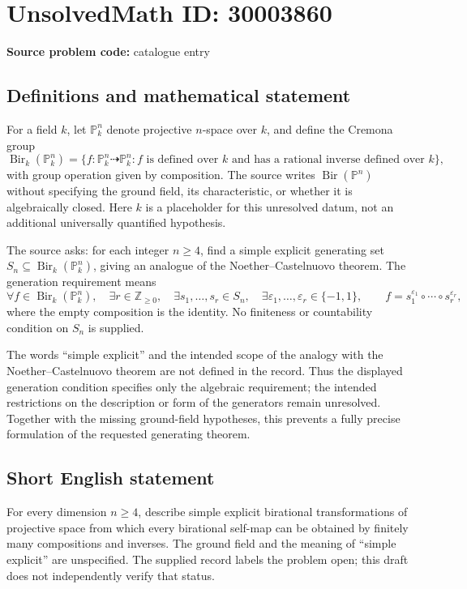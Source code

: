 \documentclass[11pt]{article}
\newcommand{\Z}{\mathbb{Z}}
\newcommand{\PP}{\mathbb{P}}
\begin{document}
\section*{UnsolvedMath ID: 30003860}
\textbf{Source problem code:} catalogue entry
\subsection{Definitions and mathematical statement}
For a field \(k\), let \(\PP^n_k\) denote projective \(n\)-space over \(k\), and define the Cremona group
\[
\operatorname{Bir}_k(\PP^n_k)=\{f\colon\PP^n_k\dashrightarrow\PP^n_k : f\text{ is defined over }k\text{ and has a rational inverse defined over }k\},
\]
with group operation given by composition. The source writes \(\operatorname{Bir}(\PP^n)\) without specifying the ground field, its characteristic, or whether it is algebraically closed. Here \(k\) is a placeholder for this unresolved datum, not an additional universally quantified hypothesis.

The source asks: for each integer \(n\geq4\), find a simple explicit generating set \(S_n\subseteq\operatorname{Bir}_k(\PP^n_k)\), giving an analogue of the Noether--Castelnuovo theorem. The generation requirement means
\[
\forall f\in\operatorname{Bir}_k(\PP^n_k),\quad
\exists r\in\Z_{\geq0},\quad
\exists s_1,\ldots,s_r\in S_n,\quad
\exists \varepsilon_1,\ldots,\varepsilon_r\in\{-1,1\},\qquad
f=s_1^{\varepsilon_1}\circ\cdots\circ s_r^{\varepsilon_r},
\]
where the empty composition is the identity. No finiteness or countability condition on \(S_n\) is supplied.

The words ``simple explicit'' and the intended scope of the analogy with the Noether--Castelnuovo theorem are not defined in the record. Thus the displayed generation condition specifies only the algebraic requirement; the intended restrictions on the description or form of the generators remain unresolved. Together with the missing ground-field hypotheses, this prevents a fully precise formulation of the requested generating theorem.
\subsection{Short English statement}
For every dimension \(n\geq4\), describe simple explicit birational transformations of projective space from which every birational self-map can be obtained by finitely many compositions and inverses. The ground field and the meaning of ``simple explicit'' are unspecified. The supplied record labels the problem open; this draft does not independently verify that status.
\end{document}
